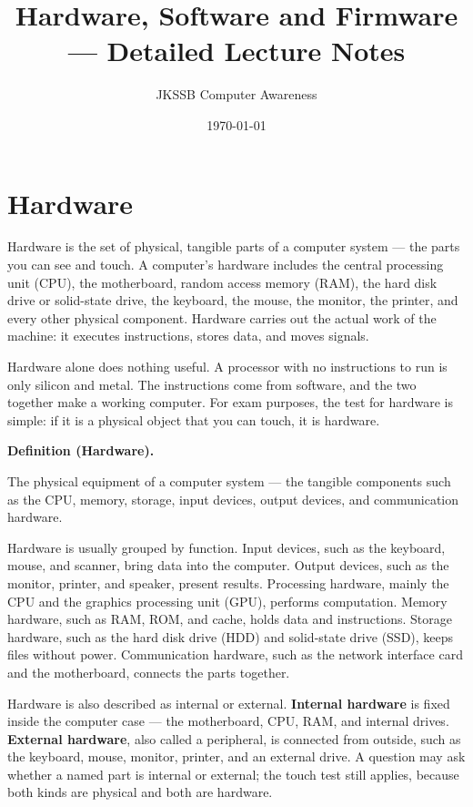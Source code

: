 \documentclass[11pt]{article}
\title{Hardware, Software and Firmware --- Detailed Lecture Notes}
\author{JKSSB Computer Awareness}
\date{\today}
\newenvironment{definitionbox}[1]{%
  \par\noindent\textbf{Definition (#1).}\ \itshape
}{\par\vspace{0.3em}}
\begin{document}
\maketitle

\section{Hardware}
Hardware is the set of physical, tangible parts of a computer system --- the
parts you can see and touch. A computer's hardware includes the central
processing unit (CPU), the motherboard, random access memory (RAM), the hard
disk drive or solid-state drive, the keyboard, the mouse, the monitor, the
printer, and every other physical component. Hardware carries out the actual
work of the machine: it executes instructions, stores data, and moves signals.

Hardware alone does nothing useful. A processor with no instructions to run
is only silicon and metal. The instructions come from software, and the two
together make a working computer. For exam purposes, the test for hardware is
simple: if it is a physical object that you can touch, it is hardware.

\begin{definitionbox}{Hardware}
The physical equipment of a computer system --- the tangible components such
as the CPU, memory, storage, input devices, output devices, and communication
hardware.
\end{definitionbox}

Hardware is usually grouped by function. Input devices, such as the keyboard,
mouse, and scanner, bring data into the computer. Output devices, such as the
monitor, printer, and speaker, present results. Processing hardware, mainly
the CPU and the graphics processing unit (GPU), performs computation. Memory
hardware, such as RAM, ROM, and cache, holds data and instructions. Storage
hardware, such as the hard disk drive (HDD) and solid-state drive (SSD),
keeps files without power. Communication hardware, such as the network
interface card and the motherboard, connects the parts together.

Hardware is also described as internal or external. \textbf{Internal
hardware} is fixed inside the computer case --- the motherboard, CPU, RAM, and
internal drives. \textbf{External hardware}, also called a peripheral, is
connected from outside, such as the keyboard, mouse, monitor, printer, and an
external drive. A question may ask whether a named part is internal or
external; the touch test still applies, because both kinds are physical and
both are hardware.
\end{document}
